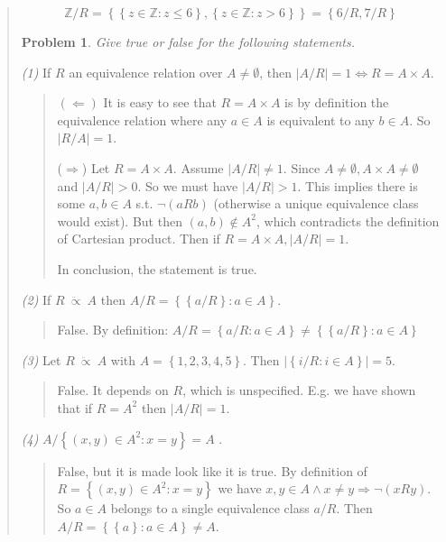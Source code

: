 \documentclass[a4paper, 12pt]{article}
\newtheorem{problem}{Problem}
\newtheorem{problem}{Problem}
\begin{document}
\begin{quote}
$$\mathbb{Z} / R = \left\{ \left\{ z \in \mathbb{Z} : z \leq 6 \right\}, \left\{
z \in \mathbb{Z} : z > 6\right\}   \right\}  = \left\{ 6 / R, 7 / R \right\} $$

\begin{problem}
    Give true or false for the following statements.
\end{problem}

\textit{(1)} If $R$ an equivalence relation over $A \neq \emptyset$, then $|A /
R| = 1 \iff R = A \times A$.

\begin{quote}
    $(\Leftarrow)$ It is easy to see that $R = A \times A$ is by definition the
    equivalence relation where any $a \in A$ is equivalent to any $b \in A$. So
    $|R / A| = 1 $.

    ($\Rightarrow$) Let  $R = A\times A$. Assume $|A / R| \neq 1$. Since $A \neq
    \emptyset, A \times A \neq \emptyset$ and $|A / R| > 0$. So we must have $|
    A / R| > 1$. This implies there is some $a,b \in A$ s.t. $\neg(aRb)$
    (otherwise a unique equivalence class would exist). But then
    $(a, b) \not\in A^2$, which contradicts the definition of Cartesian product.
    Then if $R = A \times A, |A / R| = 1$.

    In conclusion, the statement is true.
\end{quote}

\textit{(2)} If $R ~ \ddot{\propto} ~ A$ then $A / R = \left\{ \left\{ a / R
\right\} : a \in A  \right\} $. 

\begin{quote}
    False. By definition: $A / R = \left\{ a / R : a \in A \right\} \neq \left\{
    \left\{ a / R  \right\} : a \in A\right\} $
\end{quote}

\textit{(3)} Let $R ~ \ddot{\propto} ~ A$ with $A = \left\{ 1, 2,3,4,5 \right\}
$. Then $ | \left\{ i / R : i \in A \right\}  | = 5$.

\begin{quote}
    False. It depends on $R$, which is unspecified. E.g. we have shown that if
    $R = A^2$ then $ | A / R | = 1 $.
\end{quote}

\textit{(4)} $A / \left\{ (x, y) \in A^2 : x = y \right\} = A$ .

\begin{quote}
    False, but it is made look like it is true. By definition of $R = \left\{ (x, y) \in A^2 : x = y \right\} $ we have $x,
    y \in A \land x\neq y \Rightarrow \neg(xRy)$. So $a \in A$ belongs to a
    single equivalence class $a / R$. Then $A / R = \left\{ \left\{ a \right\} :
    a \in A\right\}  \neq A$.
\end{quote}


\end{quote}
\end{document}
